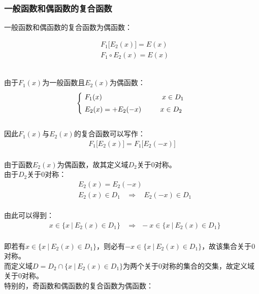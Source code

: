 \documentclass[UTF8]{ctexart}
\begin{document}
\newpage

\subsubsection{一般函数和偶函数的复合函数}
    \setcounter{equation}{0}
    一般函数和偶函数的复合函数为偶函数：
    \begin{large}
        \begin{align*}
            &F_1\big[E_2(x)\big]=E(x)\\[3mm]
            &F_1\circ E_2(x)=E(x)
        \end{align*}
    \end{large}\\
    由于$F_1(x)$为一般函数且$E_2(x)$为偶函数：\vspace{3pt}
    \begin{align}
        ~~\begin{cases}
            ~F_1(x)\hphantom{=+F_1(-x)}~~~~~~~~~~\hspace{0.5pt}x\in D_1\\[1mm]
            ~E_2(x)=+E_2(-x)~~~~~~~~x\in D_2
        \end{cases}
    \end{align}\\[3mm]
    因此$F_1(x)$与$E_2(x)$的复合函数可以写作：
    \begin{align}
        F_1\big[E_2(x)\big]=F_1\big[E_2(-x)\big]
    \end{align}\\
    由于函数$E_2(x)$为偶函数，故其定义域$D_2$关于$0$对称。\\[3mm]
    由于$D_2$关于$0$对称：
    \begin{align}
        &E_2(x)=E_2(-x)\\[5mm]
        &E_2(x)\in D_1~~~~\Longrightarrow~~~~E_2(-x)\in D_1
    \end{align}\\
    由此可以得到：
    \begin{align}
        &x\in\big\{x~|~E_2(x)\in D_1\big\}~~~~\Longrightarrow~~-x\in\big\{x~|~E_2(x)\in D_1\big\}
    \end{align}\\
    即若有$x\in\big\{x~|~E_2(x)\in D_1\big\}$，则必有$-x\in\big\{x~|~E_2(x)\in D_1\big\}$，故该集合关于$0$对称。\\[3mm]
    而定义域$D=D_2\cap\big\{x~|~E_2(x)\in D_1\big\}$为两个关于$0$对称的集合的交集，故定义域关于$0$对称。\\[6mm]
    特别的，奇函数和偶函数的复合函数为偶函数：
\end{document}

